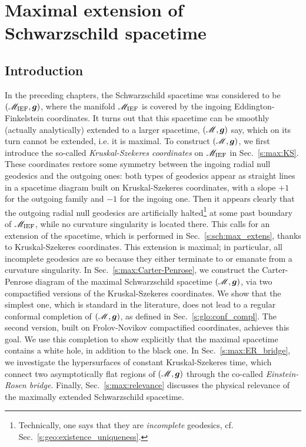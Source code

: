 \chapter{Maximal extension of Schwarzschild spacetime}
\label{s:max}

\minitoc

\section{Introduction}

In the preceding chapters, the Schwarzschild spacetime was considered
to be $(\mathscr{M}_{\rm IEF}, \bm{g})$, where the manifold $\mathscr{M}_{\rm IEF}$
is covered by the ingoing
Eddington-Finkelstein coordinates. It turns out that this spacetime
can be smoothly (actually analytically) extended to a larger spacetime,
$(\mathscr{M},\bm{g})$ say, which on its turn cannot be extended, i.e. it is maximal.
To construct $(\mathscr{M},\bm{g})$, we first introduce the so-called \emph{Kruskal-Szekeres
coordinates} on $\mathscr{M}_{\rm IEF}$ in Sec.~\ref{s:max:KS}.
These coordinates restore some symmetry between the ingoing
radial null geodesics and the outgoing ones: both types of geodesics appear
as straight lines in a spacetime diagram built on Kruskal-Szekeres coordinates,
with a slope $+1$ for the outgoing family and $-1$ for the ingoing one.
Then it appears clearly that the outgoing radial null geodesics are artificially
halted\footnote{Technically, one says that they are \emph{incomplete} geodesics, cf. Sec.~\ref{s:geo:existence_uniqueness}.}
at some past boundary of $\mathscr{M}_{\rm IEF}$, while no curvature singularity is located there.
This calls for an extension of the spacetime, which is performed
in Sec.~\ref{s:sch:max_extens}, thanks to Kruskal-Szekeres coordinates.
This extension is maximal; in particular, all
incomplete geodesics are so because they either terminate to or emanate from a
curvature singularity. In Sec.~\ref{s:max:Carter-Penrose}, we
construct the Carter-Penrose diagram of the maximal Schwarzschild spacetime $(\mathscr{M},\bm{g})$,
via two compactified versions of the Kruskal-Szekeres coordinates.
We show that the simplest one, which is standard in the literature,
does not lead to a regular conformal completion
of $(\mathscr{M},\bm{g})$, as defined in Sec.~\ref{s:glo:conf_compl}.
The second version, built on Frolov-Novikov compactified coordinates,
achieves this goal. We use this completion to show explicitly that the maximal
spacetime contains a white hole, in addition to the black one.
In Sec.~\ref{s:max:ER_bridge}, we investigate the hypersurfaces of
constant Kruskal-Szekeres time, which connect two asymptotically flat regions
of $(\mathscr{M},\bm{g})$ through the co-called \emph{Einstein-Rosen bridge}.
Finally, Sec.~\ref{s:max:relevance} discusses the physical relevance
of the maximally extended Schwarzschild spacetime.

